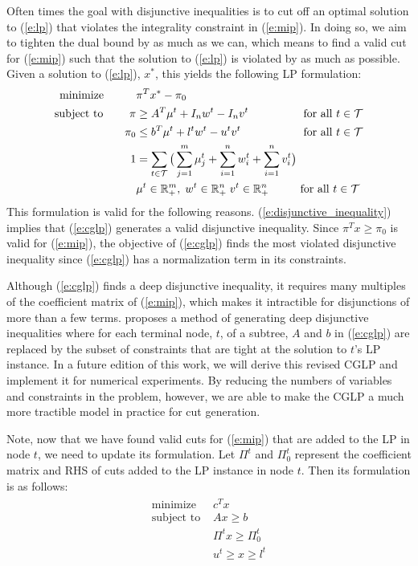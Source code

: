 \documentclass[10pt]{article}
\begin{document}
	Often times the goal with disjunctive inequalities is to cut off an optimal solution to (\ref{e:lp}) that violates the integrality constraint in (\ref{e:mip}). In doing so, we aim to tighten the dual bound by as much as we can, which means to find a valid cut for (\ref{e:mip}) such that the solution to (\ref{e:lp}) is violated by as much as possible. Given a solution to (\ref{e:lp}), $ x^* $, this yields the following LP formulation:
	\begin{equation}
		\begin{alignedat}{2} \label{e:cglp}
			\text{minimize } \; \; \qquad & \pi^T x^* - \pi_0 && \\
			\text{subject to } \qquad \pi & \geq A^T \mu^t + I_n w^t - I_n v^t && \; \text{ for all } t \in \mathcal{T} \\
			\pi_0 & \leq b^T \mu^t + l^t w^t - u^t v^t && \; \text{ for all } t \in \mathcal{T} \\
			1 & = \sum_{t \in \mathcal{T}} \big( \sum_{j=1}^{m} \mu_j^t + \sum_{i=1}^{n} w_i^t + \sum_{i=1}^{n} v_i^t \big) && \\
			& \mu^t \in \mathbb{R}_+^m, \; w^t \in \mathbb{R}_+^n \; v^t \in \mathbb{R}_+^n && \text{ for all } t \in \mathcal{T}
		\end{alignedat}
	\end{equation}
	This formulation is valid for the following reasons. (\ref{e:disjunctive_inequality}) implies that (\ref{e:cglp}) generates a valid disjunctive inequality. Since $ \pi^T x \geq \pi_0 $ is valid for (\ref{e:mip}), the objective of (\ref{e:cglp}) finds the most violated disjunctive inequality since (\ref{e:cglp}) has a normalization term in its constraints.
	
	Although (\ref{e:cglp}) finds a deep disjunctive inequality, it requires many multiples of the coefficient matrix of (\ref{e:mip}), which makes it intractible for disjunctions of more than a few terms. \cite{aleks} proposes a method of generating deep disjunctive inequalities where for each terminal node, $ t $, of a subtree, $ A $ and $ b $ in (\ref{e:cglp}) are replaced by the subset of constraints that are tight at the solution to $ t $'s LP instance. In a future edition of this work, we will derive this revised CGLP and implement it for numerical experiments. By reducing the numbers of variables and constraints in the problem, however, we are able to make the CGLP a much more tractible model in practice for cut generation.	
	
	Note, now that we have found valid cuts for (\ref{e:mip}) that are added to the LP in node $ t $, we need to update its formulation. Let $ \Pi^t $ and $ \Pi_0^t $ represent the coefficient matrix and RHS of cuts added to the LP instance in node $ t $. Then its formulation is as follows:
	\begin{align}
		\begin{split}
			\text{minimize } & c^T x \\
			\text{subject to } & Ax \geq b \\
			& \Pi^t x \geq \Pi_0^t \\
			& u^t \geq x \geq l^t
		\end{split} \label{e:lp_cut}
	\end{align}
	
\end{document}
